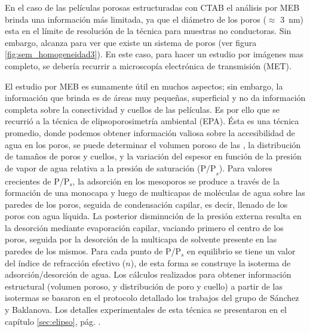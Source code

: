		 En el caso de las películas porosas estructuradas con CTAB el análisis por MEB brinda una información más limitada, ya que el diámetro de los poros ($\approx$ \SI{3}{\nm}) esta en el límite de resolución de la técnica para muestras no conductoras. Sin embargo, alcanza para  ver que existe un sistema de poros (ver figura \ref{fig:sem_homogeneidad3}). En este caso, para hacer un estudio por imágenes mas completo, se debería recurrir a microscopía electrónica de transmisión (MET).

		 El estudio por MEB es sumamente útil en muchos aspectos; sin embargo, la información que brinda es de áreas muy pequeñas, superficial y no da información completa sobre la conectividad y cuellos de las películas. Es por ello que se recurrió a la técnica de elipsoporosimetría ambiental (EPA). Ésta es una técnica promedio, donde podemos obtener información valiosa sobre la accesibilidad de agua en los poros, se puede determinar el volumen poroso de las \pdm, la distribución de tamaños de poros y cuellos, y la variación del espesor en función de la presión de vapor de agua relativa a la presión de saturación ($\text{P/P}_s$). Para valores crecientes de P/P$_s$, la adsorción en los mesoporos se produce a través de la formación de una monocapa y luego de multicapas de moléculas de agua sobre las paredes de los poros, seguida de condensación capilar, es decir, llenado de los poros con agua líquida. La posterior disminución de la presión externa resulta en la desorción mediante evaporación capilar, vaciando primero el centro de los poros, seguida por la desorción de la multicapa de solvente presente en las paredes de los mismos. Para cada punto de P/P$_s$ en equilibrio se tiene un valor del índice de refracción efectivo ($n$), de esta forma se construye la isoterma de adsorción/desorción de agua. Los cálculos realizados para obtener información estructural (volumen poroso, y distribución de poro y cuello) a partir de las isotermas se basaron en el protocolo detallado los trabajos del grupo de Sánchez y Baklanova\cite{Baklanov2000,Boissiere2005,Sakatani2006}. Los detalles experimentales de esta técnica se presentaron en el capítulo \ref{sec:elipso}, pág. \pageref{sec:elipso}.

